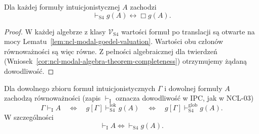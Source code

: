 \begin{wniosek}
\label{cor:ncl-modal-goedel-stability}
Dla każdej formuły intuicjonistycznej $A$
zachodzi
\[
 \vdash_{\mathrm{S4}}g(A)\leftrightarrow\Box g(A).
\]
\end{wniosek}
\begin{proof}
W każdej algebrze z klasy $\mathcal V_{\mathrm{S4}}$
wartości formuł po translacji są otwarte
na mocy Lematu~\ref{lem:ncl-modal-goedel-valuation}.
Wartości obu członów równoważności są więc
równe. Z pełności algebraicznej dla twierdzeń
(Wniosek~\ref{cor:ncl-modal-algebra-theorem-completeness})
otrzymujemy żądaną dowodliwość.
\end{proof}

\begin{twierdzenie}
\label{thm:ncl-modal-goedel-embedding}
Dla dowolnego zbioru formuł intuicjonistycznych
$\Gamma$ i dowolnej formuły $A$ zachodzą
równoważności (zapis $\vdash_{\mathrm I}$
oznacza dowodliwość w IPC, jak w NCL-03)
\[
 \Gamma\vdash_{\mathrm I} A
 \quad\Longleftrightarrow\quad
 g[\Gamma]\vdash_{\mathrm{S4}}^{\mathrm{lok}}g(A)
 \quad\Longleftrightarrow\quad
 g[\Gamma]\vdash_{\mathrm{S4}}^{\mathrm{glob}}g(A).
\]
W szczególności
\[
 \vdash_{\mathrm I}A
 \iff \vdash_{\mathrm{S4}}g(A).
\]
\end{twierdzenie}
